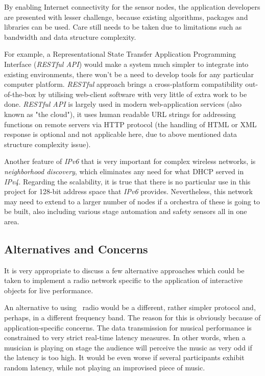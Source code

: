   By enabling Internet connectivity for the sensor nodes, the application
 developers are presented with lesser challenge, because existing algorithms,
 packages and libraries can be used. Care still needs to be taken due
 to limitations such as bandwidth and data structure complexity.

 For example, a Representational State Transfer Application Programming
 Interface (\emph{RESTful API}) \cite{links:wiki:rest} would make a
 system much simpler to integrate into existing environments,
 there won't be a need to develop tools for any particular computer platform.
 \emph{RESTful} approach brings a cross-platform compatibility out-of-the-box
 by utilising web-client software with very little of extra work to be done.
 \emph{RESTful API} is largely used in modern web-application services
 (also known as "the cloud"), it uses human readable URL strings for
 addressing functions on remote servers via HTTP protocol (the handling
 of HTML or XML response is optional and not applicable here, due to above
 mentioned data structure complexity issue).

 Another feature of \emph{IPv6} that is very important for complex wireless
 networks, is \emph{neighborhood discovery}, which eliminates any need
 for what DHCP served in \emph{IPv4}. Regarding the scalability,
 it is true that there is no particular use in this project for 128-bit
 address space that \emph{IPv6} provides. Nevertheless, this network
 may need to extend to a larger number of nodes if a orchestra of these
 is going to be built, also including various stage automation and
 safety sensors all in one area.


\subsection{Alternatives and Concerns}

  It is very appropriate to discuss a few alternative approaches which
 could be taken to implement a radio network specific to the application
 of interactive objects for live performance.

  An alternative to using \WPAN\ radio would be a different, rather
 simpler protocol and, perhaps, in a different frequency band.
  The reason for this is obviously because of application-specific
 concerns. The data transmission for musical performance is constrained
 to very strict real-time latency measures. In other words, when a
 musician is playing on stage the audience will perceive the music as
 very odd if the latency is too high. It would be even worse if several
 participants exhibit random latency, while not playing an improvised
 piece of music.

